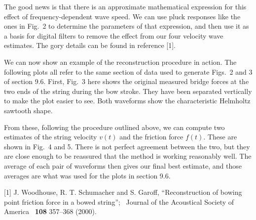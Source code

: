   The good news is that there is an approximate mathematical expression for 
  this effect of frequency-dependent wave speed. We can use pluck responses 
  like the ones in Fig.\ 2 to determine the parameters of that expression, and 
  then use it as a basis for digital filters to remove the effect from our four 
  velocity wave estimates. The gory details can be found in reference [1]. 

  We can now show an example of the reconstruction procedure in action. The 
  following plots all refer to the same section of data used to generate Figs.\ 
  2 and 3 of section 9.6. First, Fig.\ 3 here shows the original measured 
  bridge forces at the two ends of the string during the bow stroke. They have 
  been separated vertically to make the plot easier to see. Both waveforms show 
  the characteristic Helmholtz sawtooth shape. 

  From these, following the procedure outlined above, we can compute two 
  estimates of the string velocity $v(t)$ and the friction force $f(t)$. These 
  are shown in Fig.\ 4 and 5. There is not perfect agreement between the two, 
  but they are close enough to be reassured that the method is working 
  reasonably well. The average of each pair of waveforms then gives our final 
  best estimate, and those averages are what was used for the plots in section 
  9.6. 

  \sectionreferences{}[1] J. Woodhouse, R. T. Schumacher and S. Garoff, 
  “Reconstruction of bowing point friction force in a bowed string”;  Journal 
  of the Acoustical Society of America  \textbf{108} 357–368 (2000). 